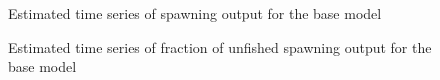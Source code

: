 \documentclass[
]{scrartcl}
\begin{document}
\clearpage 


\begin{figure}


\caption{\label{fig-es-ssb}Estimated time series of spawning output for
the base model}

\end{figure}%

\begin{figure}


\caption{\label{fig-es-frac-unfished}Estimated time series of fraction
of unfished spawning output for the base model}

\end{figure}%
\end{document}
